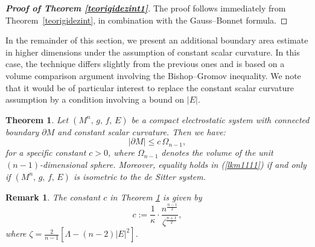 \documentclass{amsart}
\newtheorem{remark}{Remark}
\newtheorem{theorem}{Theorem}
\numberwithin{equation}{section}
\begin{document}
	
\begin{proof}[{\bf Proof of Theorem \ref{teorigidezint1}}]
The proof follows immediately from Theorem~\ref{teorigidezint}, in combination with the Gauss–Bonnet formula.
\end{proof}	




        		
In the remainder of this section, we present an additional boundary area estimate in higher dimensions under the  assumption of constant scalar curvature. In this case, the technique differs slightly from the previous ones and is based on a volume comparison argument involving the Bishop–Gromov inequality. We note that it would be of particular interest to replace the constant scalar curvature assumption by a condition involving a bound on $|E|$. 

\begin{theorem}
\label{thm6}
Let \( (M^n,\,g,\,f,\,E) \) be a compact electrostatic system with connected boundary \( \partial M \) and constant scalar curvature. Then we have:
\begin{equation}
\label{lkm1111}
|\partial M| \leq c\, \Omega_{n-1},
\end{equation}
for a specific constant \( c > 0 \), where \( \Omega_{n-1} \) denotes the volume of the unit \((n-1)\)-dimensional sphere. Moreover, equality holds in (\ref{lkm1111}) if and only if \( (M^n,\,g,\,f,\,E) \) is isometric to the de Sitter system.
\end{theorem}

\begin{remark}
The constant \( c \) in Theorem \ref{thm6} is given by
\begin{equation*}
c := \frac{1}{\kappa} \cdot \frac{n^{\frac{n-1}{2}}}{\zeta^{\frac{n+1}{2}}},
\end{equation*}
where \( \zeta = \frac{2}{n-1} \left[ \Lambda - (n-2)|E|^2 \right] \).
\end{remark}
\end{document}

